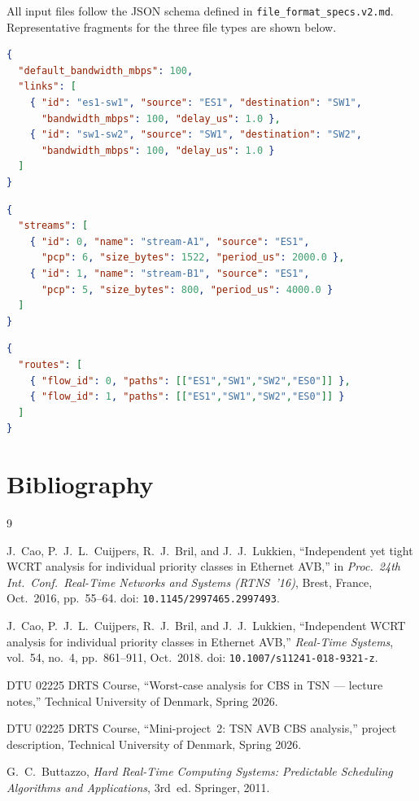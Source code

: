 \documentclass[11pt,a4paper]{article}
\begin{document}
All input files follow the JSON schema defined in
\texttt{file\_format\_specs.v2.md}.
Representative fragments for the three file types are shown below.

\begin{lstlisting}[language=json, caption={Topology file fragment.}]
{
  "default_bandwidth_mbps": 100,
  "links": [
    { "id": "es1-sw1", "source": "ES1", "destination": "SW1",
      "bandwidth_mbps": 100, "delay_us": 1.0 },
    { "id": "sw1-sw2", "source": "SW1", "destination": "SW2",
      "bandwidth_mbps": 100, "delay_us": 1.0 }
  ]
}
\end{lstlisting}

\begin{lstlisting}[language=json, caption={Streams file fragment.}]
{
  "streams": [
    { "id": 0, "name": "stream-A1", "source": "ES1",
      "pcp": 6, "size_bytes": 1522, "period_us": 2000.0 },
    { "id": 1, "name": "stream-B1", "source": "ES1",
      "pcp": 5, "size_bytes": 800, "period_us": 4000.0 }
  ]
}
\end{lstlisting}

\begin{lstlisting}[language=json, caption={Routes file fragment.}]
{
  "routes": [
    { "flow_id": 0, "paths": [["ES1","SW1","SW2","ES0"]] },
    { "flow_id": 1, "paths": [["ES1","SW1","SW2","ES0"]] }
  ]
}
\end{lstlisting}

\section{Bibliography}

\begin{thebibliography}{9}

J.~Cao, P.~J.~L.~Cuijpers, R.~J.~Bril, and J.~J.~Lukkien,
``Independent yet tight WCRT analysis for individual priority classes
in Ethernet AVB,''
in \textit{Proc.\ 24th Int.\ Conf.\ Real-Time Networks and Systems
(RTNS~'16)}, Brest, France, Oct.\ 2016, pp.\ 55--64.
doi: \texttt{10.1145/2997465.2997493}.

J.~Cao, P.~J.~L.~Cuijpers, R.~J.~Bril, and J.~J.~Lukkien,
``Independent WCRT analysis for individual priority classes in Ethernet AVB,''
\textit{Real-Time Systems}, vol.~54, no.~4, pp.\ 861--911, Oct.\ 2018.
doi: \texttt{10.1007/s11241-018-9321-z}.

DTU 02225 DRTS Course,
``Worst-case analysis for CBS in TSN --- lecture notes,''
Technical University of Denmark, Spring 2026.

DTU 02225 DRTS Course,
``Mini-project~2: TSN AVB CBS analysis,'' project description,
Technical University of Denmark, Spring 2026.

G.~C.~Buttazzo,
\textit{Hard Real-Time Computing Systems: Predictable Scheduling Algorithms
and Applications}, 3rd~ed.
Springer, 2011.

\end{thebibliography}
\end{document}
